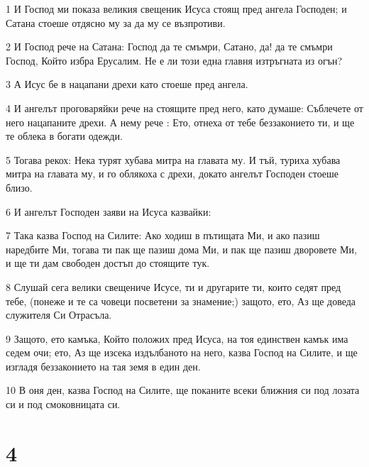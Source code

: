 \par 1 И Господ ми показа великия свещеник Исуса стоящ пред ангела Господен; и Сатана стоеше отдясно му за да му се възпротиви.
\par 2 И Господ рече на Сатана: Господ да те смъмри, Сатано, да! да те смъмри Господ, Който избра Ерусалим. Не е ли този една главня изтръгната из огън?
\par 3 А Исус бе в нацапани дрехи като стоеше пред ангела.
\par 4 И ангелът проговаряйки рече на стоящите пред него, като думаше: Съблечете от него нацапаните дрехи. А нему рече : Ето, отнеха от тебе беззаконието ти, и ще те облека в богати одежди.
\par 5 Тогава рекох: Нека турят хубава митра на главата му. И тъй, туриха хубава митра на главата му, и го облякоха с дрехи, докато ангелът Господен стоеше близо.
\par 6 И ангелът Господен заяви на Исуса казвайки:
\par 7 Така казва Господ на Силите: Ако ходиш в пътищата Ми, и ако пазиш наредбите Ми, тогава ти пак ще пазиш дома Ми, и пак ще пазиш дворовете Ми, и ще ти дам свободен достъп до стоящите тук.
\par 8 Слушай сега велики свещениче Исусе, ти и другарите ти, които седят пред тебе, (понеже и те са човеци посветени за знамение;) защото, ето, Аз ще доведа служителя Си Отрасъла.
\par 9 Защото, ето камъка, Който положих пред Исуса, на тоя единствен камък има седем очи; ето, Аз ще изсека издълбаното на него, казва Господ на Силите, и ще изгладя беззаконието на тая земя в един ден.
\par 10 В оня ден, казва Господ на Силите, ще поканите всеки ближния си под лозата си и под смоковницата си.

\chapter{4}

